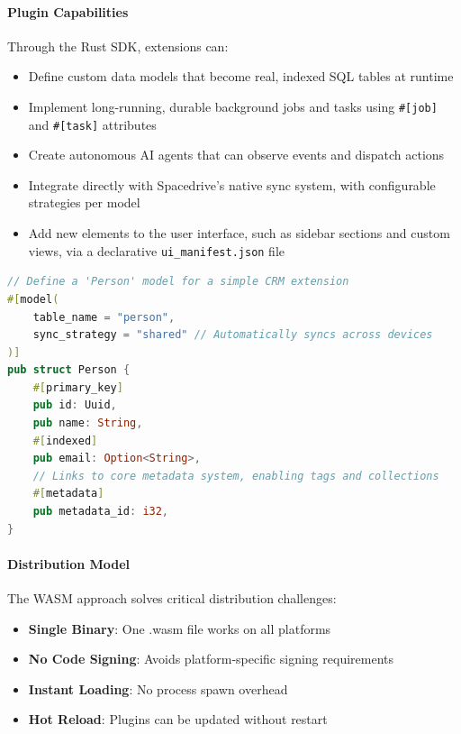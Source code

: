 \documentclass[sigconf]{acmart}
\begin{document}
\paragraph{Plugin Capabilities}
Through the Rust SDK, extensions can:
\begin{itemize}
    \item Define custom data models that become real, indexed SQL tables at runtime
    \item Implement long-running, durable background jobs and tasks using \texttt{\#[job]} and \texttt{\#[task]} attributes
    \item Create autonomous AI agents that can observe events and dispatch actions
    \item Integrate directly with Spacedrive's native sync system, with configurable strategies per model
    \item Add new elements to the user interface, such as sidebar sections and custom views, via a declarative \texttt{ui\_manifest.json} file
\end{itemize}

\begin{lstlisting}[language=Rust, caption=Example extension model definition using the Rust SDK]
// Define a 'Person' model for a simple CRM extension
#[model(
    table_name = "person",
    sync_strategy = "shared" // Automatically syncs across devices
)]
pub struct Person {
    #[primary_key]
    pub id: Uuid,
    pub name: String,
    #[indexed]
    pub email: Option<String>,
    // Links to core metadata system, enabling tags and collections
    #[metadata]
    pub metadata_id: i32,
}
\end{lstlisting}

\paragraph{Distribution Model}
The WASM approach solves critical distribution challenges:
\begin{itemize}
    \item \textbf{Single Binary}: One .wasm file works on all platforms
    \item \textbf{No Code Signing}: Avoids platform-specific signing requirements
    \item \textbf{Instant Loading}: No process spawn overhead
    \item \textbf{Hot Reload}: Plugins can be updated without restart
\end{itemize}
\end{document}
